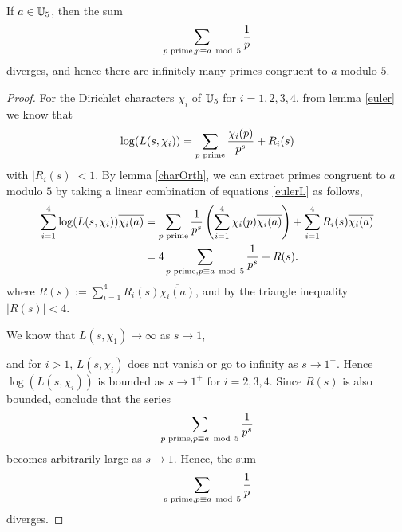 \documentclass{unswmaths}
\begin{document}
    \begin{theorem}
        If $a \in \mathbb{U}_5$, then the sum
        \begin{equation*}
            \sum_{{p\text{ prime}}, p \equiv a \;\operatorname{mod}\;5} \frac{1}{p}
        \end{equation*}
        diverges, and hence there are infinitely many primes congruent to $a$ modulo $5$.
    \end{theorem}
    \begin{proof}
        For the Dirichlet characters $\chi_i$ of $\mathbb{U}_5$ for $i = 1,2,3,4$, from lemma \ref{euler} we know that
        \begin{equation*}
        \label{eulerL}
            \log(L(s,\chi_i)) = \sum_{{p\text{ prime}}} \frac{\chi_i(p)}{p^s}+R_i(s)
        \end{equation*}
        with $|R_i(s)| < 1$. By lemma \ref{charOrth}, we can extract primes congruent to $a$ modulo $5$
        by taking a linear combination of equations \ref{eulerL} as follows,
        \begin{align*}
            \sum_{i=1}^4 \log(L(s,\chi_i))\overline{\chi_i(a)} &= \sum_{{p\text{ prime}}} \frac{1}{p^s}\left(\sum_{i=1}^4 \chi_i(p)\overline{\chi_i(a)}\right) + \sum_{i=1}^4 R_i(s)\overline{\chi_i(a)}\\
            &= 4\sum_{{p\text{ prime}}, p\equiv a\;\operatorname{mod}\;5} \frac{1}{p^s} + R(s).
        \end{align*}
        where $R(s) := \sum_{i=1}^4 R_i(s)\overline{\chi_i(a)}$, and by the triangle inequality $|R(s)| < 4$.
        
        We know that $L(s,\chi_1) \rightarrow \infty$ as $s\rightarrow 1$,
        
        
        and for $i> 1$, $L(s,\chi_i)$ does not vanish or go to infinity as $s\rightarrow 1^+$. Hence
        $\log(L(s,\chi_i))$ is bounded as $s\rightarrow 1^+$ for $i = 2,3,4$. Since $R(s)$ is also
        bounded,         
        conclude that the series
        \begin{equation*}
            \sum_{{p\text{ prime}}, p\equiv a\;\operatorname{mod}\;5} \frac{1}{p^s}
        \end{equation*}
        becomes arbitrarily large as $s\rightarrow 1$. Hence, 
        the sum
        \begin{equation*}
            \sum_{{p\text{ prime}}, p\equiv a\;\operatorname{mod}\;5} \frac{1}{p}
        \end{equation*}
        diverges.
    \end{proof} 
    
    
\end{document}
